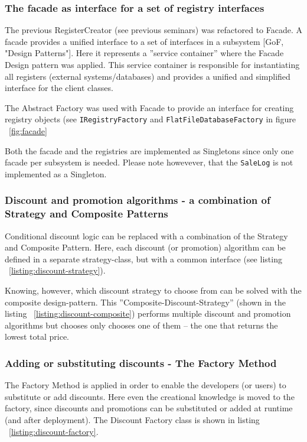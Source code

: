 \documentclass[a4paper]{scrreprt}
\begin{document}
\subsubsection{The facade as interface for a set of registry interfaces}
The previous RegisterCreator (see previous seminars) was refactored to Facade.
A facade provides a unified interface to a
set of interfaces in a subsystem [GoF, "Design Patterns"].
Here it represents a ''service container'' where the Facade Design pattern was applied.
This service container is responsible for instantiating all registers
(external systems/databases) and provides
a unified and simplified interface for the client classes.

The Abstract Factory was used with Facade to provide an
interface for creating registry objects
(see \texttt{IRegistryFactory}
and \texttt{FlatFileDatabaseFactory} in figure ~\ref{fig:facade}

Both the facade and the registries are implemented as
Singletons since only one facade per subsystem is needed.
Please note howevever, that the \texttt{SaleLog}
is not implemented as a Singleton.


\subsubsection{Discount and promotion algorithms - a combination of Strategy and Composite Patterns}
Conditional discount logic can be replaced with
a combination of the Strategy and Composite Pattern.
Here, each discount (or promotion) algorithm
can be defined in a separate strategy-class, but with a common interface
(see listing ~\ref{listing:discount-strategy}).

Knowing, however, which discount strategy to choose from
can be solved with the composite design-pattern.
This ''Composite-Discount-Strategy''
(shown in the listing ~\ref{listing:discount-composite})
performs multiple discount and promotion algorithms but chooses only chooses
one of them -- the one that returns the lowest total price.

\subsubsection*{Adding or substituting discounts - The Factory Method}
The Factory Method is applied in order to enable the developers (or users) to substitute
or add discounts.
Here even the creational knowledge is moved to the factory,
since discounts and promotions can be substituted or added at runtime (and after deployment).
The Discount Factory class is shown in listing ~\ref{listing:discount-factory}.
\end{document}
